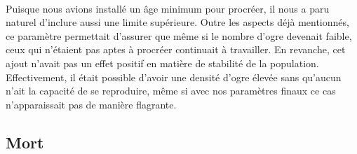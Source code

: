 \paragraph{}
Puisque nous avions installé un âge minimum pour procréer, il nous a paru
naturel d'inclure aussi une limite supérieure. Outre les aspects déjà
mentionnés, ce paramètre permettait d'assurer que même si le nombre d'ogre
devenait faible, ceux qui n'étaient pas aptes à procréer continuait à
travailler. En revanche, cet ajout n'avait pas un effet positif en matière de
stabilité de la population. Effectivement, il était possible d'avoir une
densité d'ogre élevée sans qu'aucun n'ait la capacité de se reproduire, même
si avec nos paramètres finaux ce cas n'apparaissait pas de manière flagrante.

\subsection{Mort}
